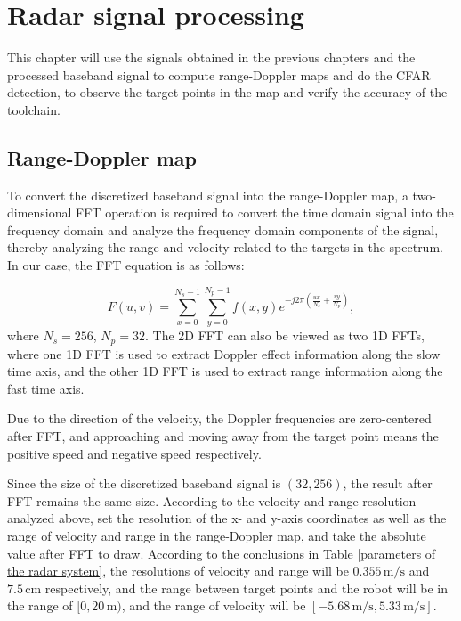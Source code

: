 \documentclass[12pt,DIV14,BCOR12mm,a4paper,footinclude=false,headinclude,parskip=half-,twoside,openright,cleardoublepage=empty,toc=index,bibliography=totoc,listof=totoc]{scrreprt}
\numberwithin{equation}{chapter}
\begin{document}
\chapter{Radar signal processing} \label{Radar signal processing}
This chapter will use the signals obtained in the previous chapters and the processed baseband signal to compute range-Doppler maps and do the CFAR detection, to observe the target points in the map and verify the accuracy of the toolchain.

\section{Range-Doppler map} \label{Range-Doppler map}

To convert the discretized baseband signal into the range-Doppler map, a two-dimensional FFT operation \cite{kronauge_new_2014} is required to convert the time domain signal into the frequency domain and analyze the frequency domain components of the signal, thereby analyzing the range and velocity related to the targets in the spectrum. In our case, the FFT equation is as follows:

\begin{equation}
F(u,v) = \sum_{x=0}^{N_s-1} \sum_{y=0}^{N_p-1} f(x,y) e^{-j 2 \pi \left( \frac{ux}{N_s} + \frac{vy}{N_p} \right)},
\end{equation}
where $N_s=256$, $N_p=32$. The 2D FFT can also be viewed as two 1D FFTs, where one 1D FFT is used to extract Doppler effect information along the slow time axis, and the other 1D FFT is used to extract range information along the fast time axis. 

Due to the direction of the velocity, the Doppler frequencies are zero-centered after FFT, and approaching and moving away from the target point means the positive speed and negative speed respectively.

Since the size of the discretized baseband signal is $(32, 256)$, the result after FFT remains the same size. According to the velocity and range resolution analyzed above, set the resolution of the x- and y-axis coordinates as well as the range of velocity and range in the range-Doppler map, and take the absolute value after FFT to draw. According to the conclusions in Table \ref{parameters of the radar system}, the resolutions of velocity and range will be $0.355\,\mathrm{m/s}$ and $7.5\,\mathrm{cm}$ respectively, and the range between target points and the robot will be in the range of $[0, 20\,\mathrm{m})$, and the range of velocity will be $[-5.68\,\mathrm{m/s}, 5.33\,\mathrm{m/s}]$.
\end{document}
